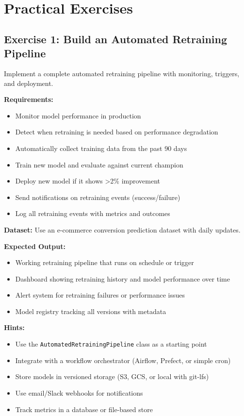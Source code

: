 \section{Practical Exercises}

\subsection{Exercise 1: Build an Automated Retraining Pipeline}

Implement a complete automated retraining pipeline with monitoring, triggers, and deployment.

\textbf{Requirements:}
\begin{itemize}
    \item Monitor model performance in production
    \item Detect when retraining is needed based on performance degradation
    \item Automatically collect training data from the past 90 days
    \item Train new model and evaluate against current champion
    \item Deploy new model if it shows >2\% improvement
    \item Send notifications on retraining events (success/failure)
    \item Log all retraining events with metrics and outcomes
\end{itemize}

\textbf{Dataset:} Use an e-commerce conversion prediction dataset with daily updates.

\textbf{Expected Output:}
\begin{itemize}
    \item Working retraining pipeline that runs on schedule or trigger
    \item Dashboard showing retraining history and model performance over time
    \item Alert system for retraining failures or performance issues
    \item Model registry tracking all versions with metadata
\end{itemize}

\textbf{Hints:}
\begin{itemize}
    \item Use the \texttt{AutomatedRetrainingPipeline} class as a starting point
    \item Integrate with a workflow orchestrator (Airflow, Prefect, or simple cron)
    \item Store models in versioned storage (S3, GCS, or local with git-lfs)
    \item Use email/Slack webhooks for notifications
    \item Track metrics in a database or file-based store
\end{itemize}

